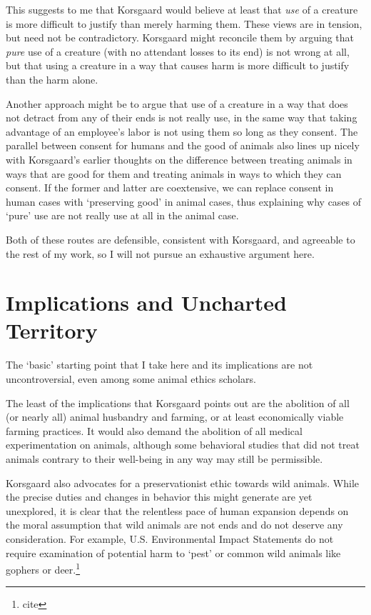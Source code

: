 		This suggests to me that Korsgaard would believe at least that
		\emph{use} of a creature is more difficult to justify than merely
		harming them. These views are in tension, but need not be
		contradictory.  Korsgaard might reconcile them by arguing that
		\emph{pure} use of a creature (with no attendant losses to its end) is
		not wrong at all, but that using a creature in a way that causes harm
		is more difficult to justify than the harm alone.

		Another approach might be to argue that use of a creature in a way that
		does not detract from any of their ends is not really use, in the same
		way that taking advantage of an employee’s labor is not using them so
		long as they consent. The parallel between consent for humans and the
		good of animals also lines up nicely with Korsgaard’s earlier thoughts
		on the difference between treating animals in ways that are good for
		them and treating animals in ways to which they can consent.
		If the former and latter are coextensive, we can replace consent in
		human cases with ‘preserving good’ in animal cases, thus explaining why
		cases of ‘pure’ use are not really use at all in the animal case.

		Both of these routes are defensible, consistent with Korsgaard, and
		agreeable to the rest of my work, so I will not pursue an exhaustive
		argument here.

	\section{Implications and Uncharted Territory}
		The ‘basic’ starting point that I take here and its implications are
		not uncontroversial, even among some animal ethics scholars.

		The least of the implications that Korsgaard points out are the
		abolition of all (or nearly all) animal husbandry and farming, or at
		least economically viable farming practices. It would also demand the
		abolition of all medical experimentation on animals, although some
		behavioral studies that did not treat animals contrary to their
		well-being in any way may still be permissible.

		Korsgaard also advocates for a preservationist ethic towards wild
		animals. While the precise duties and changes in behavior this might
		generate are yet unexplored, it is clear that the relentless pace of
		human expansion depends on the moral assumption that wild animals are
		not ends and do not deserve any consideration. For example, U.S.
		Environmental Impact Statements do not require examination of potential
		harm to ‘pest’ or common wild animals like gophers or
		deer.\footnote{cite}

